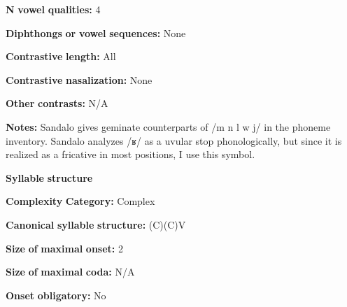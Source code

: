 \documentclass[output=paper]{langsci/langscibook}
\begin{document}
\begin{styleBody}
\textbf{N} \textbf{vowel} \textbf{qualities:} 4
\end{styleBody}

\begin{styleBody}
\textbf{Diphthongs} \textbf{or} \textbf{vowel} \textbf{sequences:} None
\end{styleBody}

\begin{styleBody}
\textbf{Contrastive} \textbf{length:} All
\end{styleBody}

\begin{styleBody}
\textbf{Contrastive} \textbf{nasalization:} None
\end{styleBody}

\begin{styleBody}
\textbf{Other} \textbf{contrasts:} N/A
\end{styleBody}

\begin{styleBody}
\textbf{Notes:} Sandalo gives geminate counterparts of /m n l w j/ in the phoneme inventory. Sandalo analyzes /ʁ/ as a uvular stop phonologically, but since it is realized as a fricative in most positions, I use this symbol.
\end{styleBody}

\begin{styleBody}
\textbf{Syllable} \textbf{structure}
\end{styleBody}

\begin{styleBody}
\textbf{Complexity} \textbf{Category:} Complex
\end{styleBody}

\begin{styleBody}
\textbf{Canonical} \textbf{syllable} \textbf{structure:} (C)(C)V \citep[17-18]{Sandalo1997}
\end{styleBody}

\begin{styleBody}
\textbf{Size} \textbf{of} \textbf{maximal} \textbf{onset:} 2
\end{styleBody}

\begin{styleBody}
\textbf{Size} \textbf{of} \textbf{maximal} \textbf{coda:} N/A
\end{styleBody}

\begin{styleBody}
\textbf{Onset} \textbf{obligatory:} No
\end{styleBody}
\end{document}
